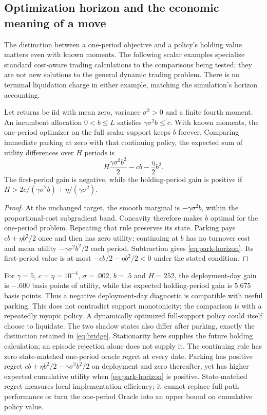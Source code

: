 \subsection{Optimization horizon and the economic meaning of a move}
The distinction between a one-period objective and a policy's holding value
matters even with known moments. The following scalar examples specialize
standard cost-aware trading calculations \cite{boyd} to the comparisons being
tested; they are not new solutions to the general dynamic trading problem.
There is no terminal liquidation charge in either example, matching the
simulation's horizon accounting.

\begin{proposition}
Let returns be iid with mean zero, variance $\sigma^2>0$ and a finite fourth
moment. An incumbent
allocation $0<b\le L$ satisfies $\gamma\sigma^2b\le c$. With known moments,
the one-period optimizer on the full scalar support keeps $b$ forever.
Comparing immediate parking at zero with that continuing policy, the expected
sum of utility differences over $H$ periods is
\begin{equation}
 H\frac{\gamma\sigma^2b^2}{2}-cb-\frac\eta2b^2.
 \label{eq:park-horizon}
\end{equation}
The first-period gain is negative, while the holding-period gain is positive
if $H>2c/(\gamma\sigma^2b)+\eta/(\gamma\sigma^2)$.
\end{proposition}
\begin{proof}
At the unchanged target, the smooth marginal is $-\gamma\sigma^2b$, within
the proportional-cost subgradient band. Concavity therefore makes $b$ optimal
for the one-period problem. Repeating that rule preserves its state. Parking
pays $cb+\eta b^2/2$ once and then has zero utility; continuing at $b$ has no
turnover cost and mean utility $-\gamma\sigma^2b^2/2$ each period. Subtraction
gives \eqref{eq:park-horizon}. Its first-period value is at most
$-cb/2-\eta b^2/2<0$ under the stated condition.
\end{proof}

For $\gamma=5$, $c=\eta=10^{-4}$, $\sigma=.002$, $b=.5$ and $H=252$,
the deployment-day gain is $-.600$ basis points of utility, while the expected
holding-period gain is $5.675$ basis points. Thus a negative deployment-day
diagnostic is compatible with useful parking. This does not contradict support
monotonicity: the comparison is with a repeatedly myopic policy. A dynamically
optimized full-support policy could itself choose to liquidate. The two shadow
states also differ after parking, exactly the distinction retained in
\eqref{eq:bridge}. Stationarity here supplies the future holding calculation;
an episode rejection alone does not supply it.
The continuing rule has zero state-matched one-period oracle regret at every
date. Parking has positive regret $cb+\eta b^2/2-\gamma\sigma^2b^2/2$ on
deployment and zero thereafter, yet has higher expected cumulative utility
when \eqref{eq:park-horizon} is positive. State-matched regret measures local
implementation efficiency; it cannot replace full-path performance or turn
the one-period Oracle into an upper bound on cumulative policy value.

